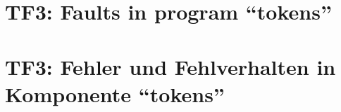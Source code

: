 
\thispagestyle{empty}
\ifenglish
\section*{TF3: Faults in program ``tokens''}

\fi
\ifgerman
\section*{TF3: Fehler und Fehlverhalten in Komponente "`tokens"'}

\fi

